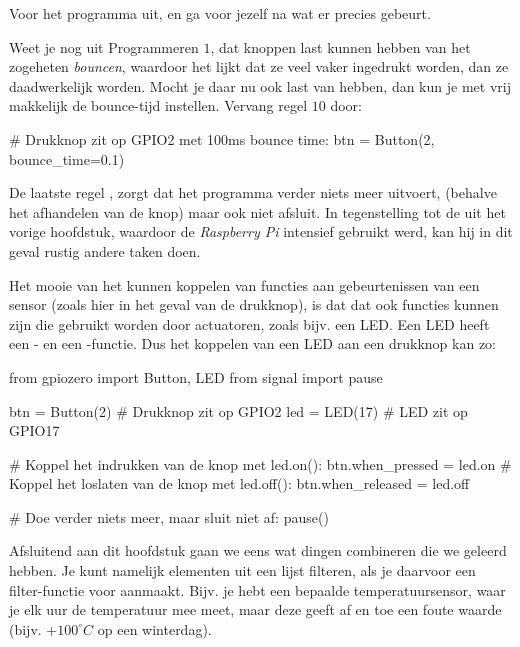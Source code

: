 \begin{exercise}
Voor het programma uit, en ga voor jezelf na wat er precies gebeurt.
\end{exercise}

\begin{remark}
Weet je nog uit Programmeren $1$, dat knoppen last kunnen hebben van het zogeheten \textit{bouncen}, waardoor het lijkt dat ze veel vaker ingedrukt worden, dan ze daadwerkelijk worden. Mocht je daar nu ook last van hebben, dan kun je met  vrij makkelijk de bounce-tijd instellen. Vervang regel $10$ door:
\begin{python}
# Drukknop zit op GPIO2 met 100ms bounce time:
btn = Button(2, bounce_time=0.1)  
\end{python}
\end{remark}

De laatste regel , zorgt dat het programma verder niets meer uitvoert, (behalve het afhandelen van de knop) maar ook niet afsluit. In tegenstelling tot de  uit het vorige hoofdstuk, waardoor de \textit{Raspberry Pi} intensief gebruikt werd, kan hij in dit geval rustig andere taken doen. 

\begin{remark}
Het mooie van het kunnen koppelen van functies aan gebeurtenissen van een sensor (zoals hier in het geval van de drukknop), is dat dat ook functies kunnen zijn die gebruikt worden door actuatoren, zoals bijv. een LED. Een LED heeft een - en een -functie. Dus het koppelen van een LED aan een drukknop kan zo:

\begin{python}
from gpiozero import Button, LED
from signal import pause

btn = Button(2)  # Drukknop zit op GPIO2
led = LED(17)    # LED zit op GPIO17

# Koppel het indrukken van de knop met led.on():
btn.when_pressed = led.on    
# Koppel het loslaten van de knop met led.off():
btn.when_released = led.off  

# Doe verder niets meer, maar sluit niet af:
pause()                      
\end{python}
\end{remark}

\newpage
Afsluitend aan dit hoofdstuk gaan we eens wat dingen combineren die we geleerd hebben. Je kunt namelijk elementen uit een lijst filteren, als je daarvoor een filter-functie voor aanmaakt. Bijv. je hebt een bepaalde temperatuursensor, waar je elk uur de temperatuur mee meet, maar deze geeft af en toe een foute waarde (bijv. +$100^\circ C$ op een winterdag). 

